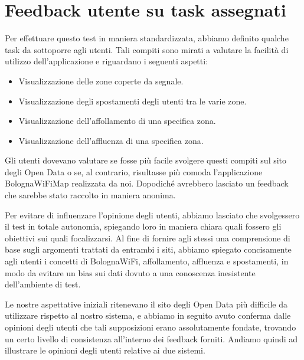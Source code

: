 \section{Feedback utente su task assegnati}
Per effettuare questo test in maniera standardizzata, abbiamo definito qualche task da sottoporre agli utenti. Tali compiti sono mirati a valutare la facilità di utilizzo dell'applicazione e riguardano i seguenti aspetti:
\begin{itemize}
    \item Visualizzazione delle zone coperte da segnale.
    \item Visualizzazione degli spostamenti degli utenti tra le varie zone.
    \item Visualizzazione dell'affollamento di una specifica zona.
    \item Visualizzazione dell'affluenza di una specifica zona.
\end{itemize}

Gli utenti dovevano valutare se fosse più facile svolgere questi compiti sul sito degli Open Data o se, al contrario, risultasse più comoda l'applicazione BolognaWiFiMap realizzata da noi. Dopodiché avrebbero lasciato un feedback che sarebbe stato raccolto in maniera anonima.

Per evitare di influenzare l'opinione degli utenti, abbiamo lasciato che svolgessero il test in totale autonomia, spiegando loro in maniera chiara quali fossero gli obiettivi sui quali focalizzarsi. Al fine di fornire agli stessi una comprensione di base sugli argomenti trattati da entrambi i siti, abbiamo spiegato concisamente agli utenti i concetti di BolognaWiFi, affollamento, affluenza e spostamenti, in modo da evitare un bias sui dati dovuto a una conoscenza inesistente dell'ambiente di test.

Le nostre aspettative iniziali ritenevano il sito degli Open Data più difficile da utilizzare rispetto al nostro sistema, e abbiamo in seguito avuto conferma dalle opinioni degli utenti che tali supposizioni erano assolutamente fondate, trovando un certo livello di consistenza all'interno dei feedback forniti. Andiamo quindi ad illustrare le opinioni degli utenti relative ai due sistemi.

